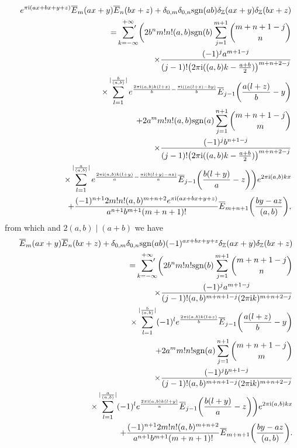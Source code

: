 \documentclass[reqno]{amsart}
\numberwithin{equation}{section}
\begin{document}
\begin{eqnarray*}
&&e^{\pi\mathrm{i}(ax+bx+y+z)}\overline{E}_{m}(ax+y)\overline{E}_{n}(bx+z)+\delta_{0,m}\delta_{0,n}\mathrm{sgn}(ab)\delta_{\mathbb{Z}}(ax+y)\delta_{\mathbb{Z}}(bx+z)\nonumber\\
&&=\sideset{}{'}\sum_{k=-\infty}^{+\infty}\biggl(2b^{n}m!n!(a,b)\mathrm{sgn}(b)
\sum_{j=1}^{m+1}\binom{m+n+1-j}{n}\nonumber\\
&&\qquad\times\frac{(-1)^{j}a^{m+1-j}}{(j-1)!\bigl(2\pi\mathrm{i}((a,b)k-\frac{a+b}{2})\bigl)^{m+n+2-j}}\nonumber\\
&&\qquad\times\sum_{l=1}^{|\frac{b}{(a,b)}|}e^{\frac{2\pi\mathrm{i}(a,b)k(l+z)}{b}-\frac{\pi\mathrm{i}((a(l+z)-by)}{b}}
\overline{E}_{j-1}\biggl(\frac{a(l+z)}{b}-y\biggl)\nonumber\\
&&\quad+2a^{m}m!n!(a,b)\mathrm{sgn}(a)\sum_{j=1}^{n+1}\binom{m+n+1-j}{m}\nonumber\\
&&\qquad\times\frac{(-1)^{j}b^{n+1-j}}{(j-1)!\bigl(2\pi\mathrm{i}((a,b)k-\frac{a+b}{2})\bigl)^{m+n+2-j}}\nonumber\\
&&\qquad\times\sum_{l=1}^{|\frac{a}{(a,b)}|}e^{\frac{2\pi\mathrm{i}(a,b)k(l+y)}{a}-\frac{\pi\mathrm{i}(b(l+y)-az)}{a}}
\overline{E}_{j-1}\biggl(\frac{b(l+y)}{a}-z\biggl)\biggl)e^{2\pi\mathrm{i}(a,b)kx}\nonumber\\
&&\quad+\frac{(-1)^{n+1}2m!n!(a,b)^{m+n+2}e^{\pi\mathrm{i}(ax+bx+y+z)}}{a^{n+1}b^{m+1}(m+n+1)!}\overline{E}_{m+n+1}\biggl(\frac{by-az}{(a,b)}\biggl),
\end{eqnarray*}
from which and $2(a,b)\mid (a+b)$ we have
\begin{eqnarray}\label{eq4.27}
&&\overline{E}_{m}(ax+y)\overline{E}_{n}(bx+z)+\delta_{0,m}\delta_{0,n}\mathrm{sgn}(ab)(-1)^{ax+bx+y+z}\delta_{\mathbb{Z}}(ax+y)\delta_{\mathbb{Z}}(bx+z)\nonumber\\
&&=\sideset{}{'}\sum_{k=-\infty}^{+\infty}\biggl(2b^{n}m!n!\mathrm{sgn}(b)
\sum_{j=1}^{m+1}\binom{m+n+1-j}{n}\nonumber\\
&&\qquad\times\frac{(-1)^{j}a^{m+1-j}}{(j-1)!(a,b)^{m+n+1-j}(2\pi\mathrm{i}k)^{m+n+2-j}}\nonumber\\
&&\qquad\times\sum_{l=1}^{|\frac{b}{(a,b)}|}(-1)^{l}e^{\frac{2\pi\mathrm{i}(a,b)k(l+z)}{b}}
\overline{E}_{j-1}\biggl(\frac{a(l+z)}{b}-y\biggl)\nonumber\\
&&\quad+2a^{m}m!n!\mathrm{sgn}(a)\sum_{j=1}^{n+1}\binom{m+n+1-j}{m}\nonumber\\
&&\qquad\times\frac{(-1)^{j}b^{n+1-j}}{(j-1)!(a,b)^{m+n+1-j}(2\pi\mathrm{i}k)^{m+n+2-j}}\nonumber\\
&&\qquad\times\sum_{l=1}^{|\frac{a}{(a,b)}|}(-1)^{l}e^{\frac{2\pi\mathrm{i}(a,b)k(l+y)}{a}}
\overline{E}_{j-1}\biggl(\frac{b(l+y)}{a}-z\biggl)\biggl)e^{2\pi\mathrm{i}(a,b)kx}\nonumber\\
&&\quad+\frac{(-1)^{n+1}2m!n!(a,b)^{m+n+2}}{a^{n+1}b^{m+1}(m+n+1)!}\overline{E}_{m+n+1}\biggl(\frac{by-az}{(a,b)}\biggl).
\end{eqnarray}
\end{document}
